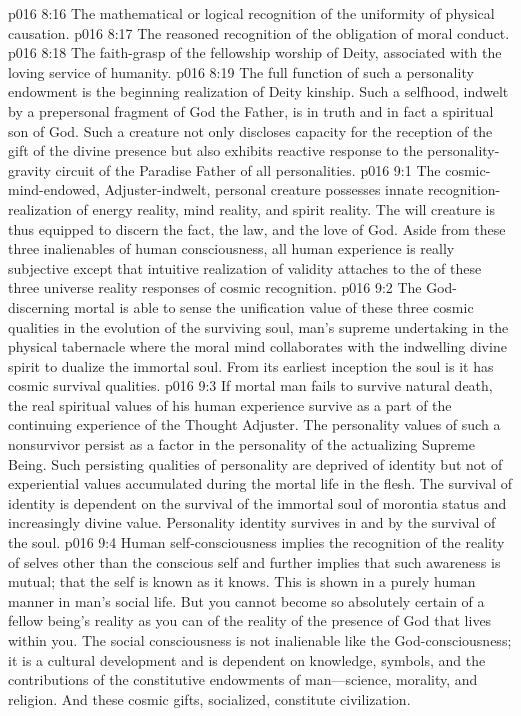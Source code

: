 \pc \vs p016 8:16 \bibnobreakspace The mathematical or logical recognition of the uniformity of physical causation.
\vs p016 8:17 \bibnobreakspace The reasoned recognition of the obligation of moral conduct.
\vs p016 8:18 \bibnobreakspace The faith\hyp{}grasp of the fellowship worship of Deity, associated with the loving service of humanity.
\pc \vs p016 8:19 The full function of such a personality endowment is the beginning realization of Deity kinship. Such a selfhood, indwelt by a prepersonal fragment of God the Father, is in truth and in fact a spiritual son of God. Such a creature not only discloses capacity for the reception of the gift of the divine presence but also exhibits reactive response to the personality\hyp{}gravity circuit of the Paradise Father of all personalities.
\vs p016 9:1 The cosmic\hyp{}mind\hyp{}endowed, Adjuster\hyp{}indwelt, personal creature possesses innate recognition\hyp{}realization of energy reality, mind reality, and spirit reality. The will creature is thus equipped to discern the fact, the law, and the love of God. Aside from these three inalienables of human consciousness, all human experience is really subjective except that intuitive realization of validity attaches to the  of these three universe reality responses of cosmic recognition.\plusone
\vs p016 9:2 The God\hyp{}discerning mortal is able to sense the unification value of these three cosmic qualities in the evolution of the surviving soul, man’s supreme undertaking in the physical tabernacle where the moral mind collaborates with the indwelling divine spirit to dualize the immortal soul. From its earliest inception the soul is  it has cosmic survival qualities.\plusone
\vs p016 9:3 If mortal man fails to survive natural death, the real spiritual values of his human experience survive as a part of the continuing experience of the Thought Adjuster. The personality values of such a nonsurvivor persist as a factor in the personality of the actualizing Supreme Being. Such persisting qualities of personality are deprived of identity but not of experiential values accumulated during the mortal life in the flesh. The survival of identity is dependent on the survival of the immortal soul of morontia status and increasingly divine value. Personality identity survives in and by the survival of the soul.\plusone
\pc \vs p016 9:4 Human self\hyp{}consciousness implies the recognition of the reality of selves other than the conscious self and further implies that such awareness is mutual; that the self is known as it knows. This is shown in a purely human manner in man’s social life. But you cannot become so absolutely certain of a fellow being’s reality as you can of the reality of the presence of God that lives within you. The social consciousness is not inalienable like the God\hyp{}consciousness; it is a cultural development and is dependent on knowledge, symbols, and the contributions of the constitutive endowments of man---science, morality, and religion. And these cosmic gifts, socialized, constitute civilization.
